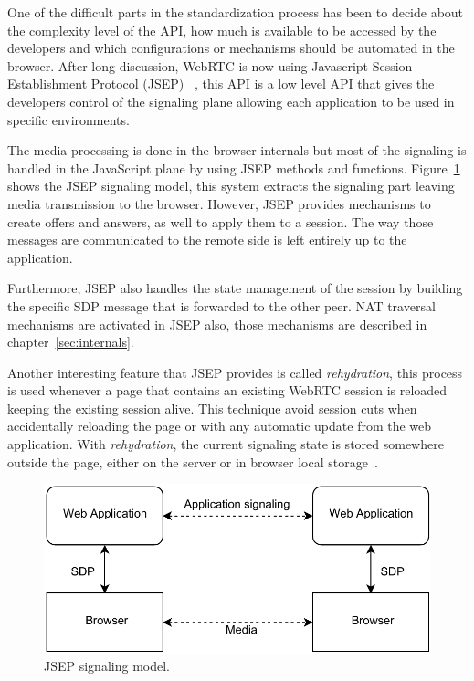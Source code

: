 One of the difficult parts in the standardization process has been to decide about the complexity level of the API, how much is available to be accessed by the developers and which configurations or mechanisms should be automated in the browser. After long discussion, WebRTC is now using Javascript Session Establishment Protocol (JSEP) ~\cite{jsepIETF}, this API is a low level API that gives the developers control of the signaling plane allowing each application to be used in specific environments.


The media processing is done in the browser internals but most of the signaling is handled in the JavaScript plane by using JSEP methods and functions. Figure~\ref{fig:JSEP} shows the JSEP signaling model, this system extracts the signaling part leaving media transmission to the browser. However, JSEP provides mechanisms to create offers and answers, as well to apply them to a session. The way those messages are communicated to the remote side is left entirely up to the application.

Furthermore, JSEP also handles the state management of the session by building the specific SDP message that is forwarded to the other peer. NAT traversal mechanisms are activated in JSEP also, those mechanisms are described in chapter~\ref{sec:internals}.


Another interesting feature that JSEP provides is called {\it rehydration}, this process is used whenever a page that contains an existing WebRTC session is reloaded keeping the existing session alive. This technique avoid session cuts when accidentally reloading the page or with any automatic update from the web application. With {\it rehydration}, the current signaling state is stored somewhere outside the page, either on the server or in browser local storage~\cite{jsepIETF}.
 
 \begin{figure}[h]
  \centering
    \includegraphics[scale=0.9]{./figures/JSEP.pdf}
      \caption[JSEP signaling model]{JSEP signaling model.}
	\label{fig:JSEP}
\end{figure}

